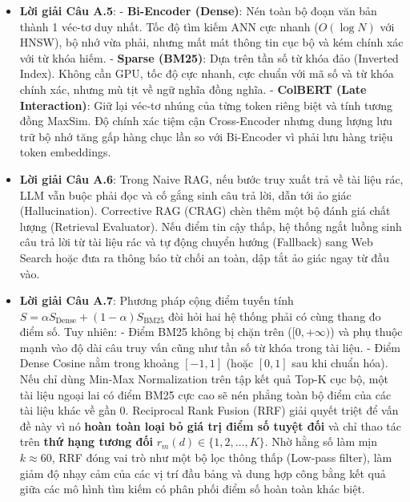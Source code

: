 \begin{itemize}
  \item \textbf{Lời giải Câu A.5}:
  - \textbf{Bi-Encoder (Dense)}: Nén toàn bộ đoạn văn bản thành 1 véc-tơ duy nhất. Tốc độ tìm kiếm ANN cực nhanh ($O(\log N)$ với HNSW), bộ nhớ vừa phải, nhưng mất mát thông tin cục bộ và kém chính xác với từ khóa hiếm.
  - \textbf{Sparse (BM25)}: Dựa trên tần số từ khóa đảo (Inverted Index). Không cần GPU, tốc độ cực nhanh, cực chuẩn với mã số và từ khóa chính xác, nhưng mù tịt về ngữ nghĩa đồng nghĩa.
  - \textbf{ColBERT (Late Interaction)}: Giữ lại véc-tơ nhúng của từng token riêng biệt và tính tương đồng MaxSim. Độ chính xác tiệm cận Cross-Encoder nhưng dung lượng lưu trữ bộ nhớ tăng gấp hàng chục lần so với Bi-Encoder vì phải lưu hàng triệu token embeddings.

  \item \textbf{Lời giải Câu A.6}:
  Trong Naive RAG, nếu bước truy xuất trả về tài liệu rác, LLM vẫn buộc phải đọc và cố gắng sinh câu trả lời, dẫn tới ảo giác (Hallucination). Corrective RAG (CRAG) chèn thêm một bộ đánh giá chất lượng (Retrieval Evaluator). Nếu điểm tin cậy thấp, hệ thống ngắt luồng sinh câu trả lời từ tài liệu rác và tự động chuyển hướng (Fallback) sang Web Search hoặc đưa ra thông báo từ chối an toàn, dập tắt ảo giác ngay từ đầu vào.

  \item \textbf{Lời giải Câu A.7}:
  Phương pháp cộng điểm tuyến tính $S = \alpha S_{\text{Dense}} + (1-\alpha) S_{\text{BM25}}$ đòi hỏi hai hệ thống phải có cùng thang đo điểm số. Tuy nhiên:
  - Điểm BM25 không bị chặn trên ($[0, +\infty)$) và phụ thuộc mạnh vào độ dài câu truy vấn cũng như tần số từ khóa trong tài liệu.
  - Điểm Dense Cosine nằm trong khoảng $[-1, 1]$ (hoặc $[0, 1]$ sau khi chuẩn hóa).
  Nếu chỉ dùng Min-Max Normalization trên tập kết quả Top-K cục bộ, một tài liệu ngoại lai có điểm BM25 cực cao sẽ nén phẳng toàn bộ điểm của các tài liệu khác về gần 0.
  Reciprocal Rank Fusion (RRF) giải quyết triệt để vấn đề này vì nó \textbf{hoàn toàn loại bỏ giá trị điểm số tuyệt đối} và chỉ thao tác trên \textbf{thứ hạng tương đối} $r_m(d) \in \{1, 2, \dots, K\}$. Nhờ hằng số làm mịn $k \approx 60$, RRF đóng vai trò như một bộ lọc thông thấp (Low-pass filter), làm giảm độ nhạy cảm của các vị trí đầu bảng và dung hợp công bằng kết quả giữa các mô hình tìm kiếm có phân phối điểm số hoàn toàn khác biệt.


\end{itemize}
